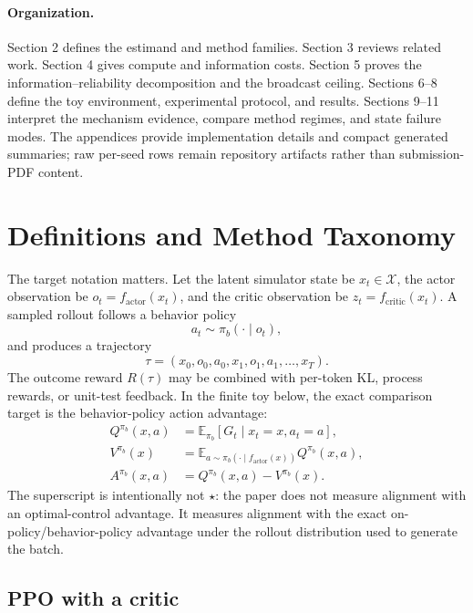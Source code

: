 \documentclass[11pt]{article}
\newcommand{\E}{\mathbb{E}}
\begin{document}
\paragraph{Organization.}
Section 2 defines the estimand and method families. Section 3 reviews related
work. Section 4 gives compute and information costs. Section 5 proves the
information--reliability decomposition and the broadcast ceiling.
Sections 6--8 define the toy environment, experimental protocol, and results.
Sections 9--11 interpret the mechanism evidence, compare method regimes, and
state failure modes. The appendices provide implementation details and compact
generated summaries; raw per-seed rows remain repository artifacts rather than
submission-PDF content.

\section{Definitions and Method Taxonomy}

The target notation matters. Let the latent simulator state be
$x_t\in\mathcal X$, the actor observation be
$o_t=f_{\mathrm{actor}}(x_t)$, and the critic observation be
$z_t=f_{\mathrm{critic}}(x_t)$. A sampled rollout follows a behavior policy
\begin{equation}
  a_t \sim \pi_b(\cdot \mid o_t),
\end{equation}
and produces a trajectory
\begin{equation}
  \tau = (x_0, o_0, a_0, x_1, o_1, a_1, \ldots, x_T).
\end{equation}
The outcome reward $R(\tau)$ may be combined with per-token KL, process rewards,
or unit-test feedback. In the finite toy below, the exact comparison target is
the behavior-policy action advantage:
\begin{align}
Q^{\pi_b}(x,a)
&= \E_{\pi_b}[G_t \mid x_t=x, a_t=a],\\
V^{\pi_b}(x)
&= \E_{a\sim\pi_b(\cdot\mid f_{\mathrm{actor}}(x))}
   Q^{\pi_b}(x,a),\\
A^{\pi_b}(x,a)
&= Q^{\pi_b}(x,a)-V^{\pi_b}(x).
\end{align}
The superscript is intentionally not $\star$: the paper does not measure
alignment with an optimal-control advantage. It measures alignment with the
exact on-policy/behavior-policy advantage under the rollout distribution used
to generate the batch.

\subsection{PPO with a critic}
\end{document}
